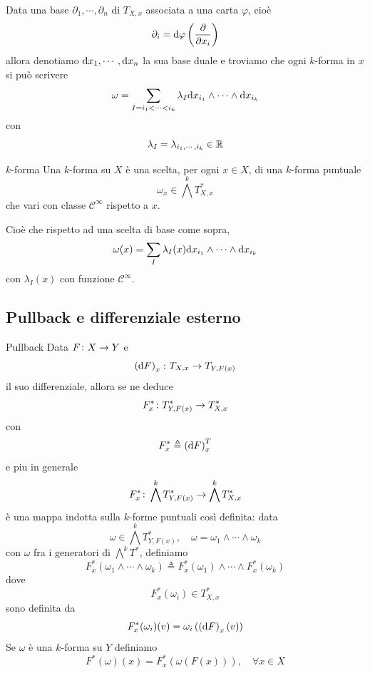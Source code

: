 \documentclass[a4paper]{article}
\begin{document}
Data una base \(\partial_1, \cdots, \partial_n\) di \(T_{X,x}\)
associata a una carta \(\varphi\), cioè
\[
    \partial_i = \text d\varphi \left(\frac{\partial}{\partial x_i}\right)    
\]
allora denotiamo \(\text dx_1, \cdots, \text dx_n\)
la sua base duale e troviamo che ogni \(k\)-forma in \(x\)
si può scrivere \[
    \omega = \sum_{I = i_1 < \cdots < i_k} \lambda_I \text dx_{i_1} \wedge \cdots \wedge \text dx_{i_k}
\]
con \[
    \lambda_I = \lambda_{i_1, \cdots, i_k} \in \mathbb{R}
\]

\begin{snippetdefinition}{\(k\)-forma}
    Una \(k\)-forma su \(X\) è una scelta, per ogni \(x \in X\),
    di una \(k\)-forma puntuale
    \[
        \omega_x \in \bigwedge^k T_{X,x}^*
    \]
    che vari con classe \(\mathcal C^\infty\) rispetto a \(x\).
\end{snippetdefinition}

Cioè che rispetto ad una scelta di base come sopra,
\[
    \omega(x) = \sum_I \lambda_I(x) \text dx_{i_1} \wedge \cdots \wedge \text dx_{i_k}
\]
con \(\lambda_I(x)\)
con funzione \(\mathcal C^\infty\).

\subsection{Pullback e differenziale esterno}

\begin{snippetdefinition}{Pullback}
    Data \(F \colon X \to Y\) e \[
        \left(\text dF\right)_x \colon T_{X,x} \to T_{Y,F(x)}
    \]
    il suo differenziale, allora se ne deduce \[
        F_x^* \colon T_{Y, F(x)}^* \to T_{X,x}^*
    \]
    con \[
        F_x^* \triangleq \left(
            \text dF
        \right)_x^T
    \]
    e piu in generale
    \[
        F_x^* \colon \bigwedge^k T_{Y,F(x)}^* \to \bigwedge^k T_{X,x}^*
    \]
    è una mappa indotta sulla \(k\)-forme puntuali così definita:
    data \[
        \omega \in \bigwedge^k T_{Y,F(x)}^*, \quad
        \omega = \omega_1 \wedge \cdots \wedge \omega_k
    \]
    con \(\omega\) fra i generatori di \(\bigwedge^k T^*\),
    definiamo
    \[
        F_x^*(\omega_1 \wedge \cdots \wedge \omega_k)
        \triangleq F_x^*(\omega_1) \wedge \cdots \wedge F_x^*(\omega_k)
    \]
    dove \[
        F_x^*(\omega_i) \in T_{X,x}^*
    \]
    sono definita da \[
        F_x^*(\omega_i)(v) = \omega_i\left(
            \left(\text dF\right)_x(v)
        \right)
    \]
    Se \(\omega\) è una \(k\)-forma su \(Y\) definiamo
    \[
        F^*(\omega)(x) = F_x^*(\omega(F(x))), \quad \forall x \in X
    \]
\end{snippetdefinition}
\end{document}
